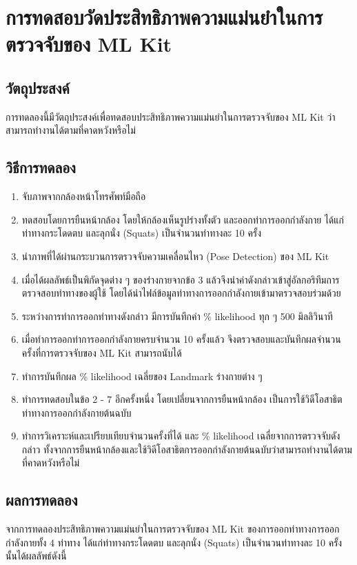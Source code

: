 \section{การทดสอบวัดประสิทธิภาพความแม่นยำในการตรวจจับของ ML Kit}
\tocless\subsection{วัตถุประสงค์}
การทดลองนี้มีวัตถุประสงค์เพื่อทดสอบประสิทธิภาพความแม่นยำในการตรวจจับของ ML Kit ว่าสามารถทำงานได้ตามที่คาดหวังหรือไม่
\tocless\subsection{วิธีการทดลอง}
\begin{enumerate}
	\item จับภาพจากกล้องหน้าโทรศัพท์มือถือ
	\item ทดสอบโดยการยืนหน้ากล้อง โดยให้กล้องเห็นรูปร่างทั้งตัว และออกท่าการออกกำลังกาย ได้แก่ท่าทางกระโดดตบ และลุกนั่ง (Squats) เป็นจำนวนท่าทางละ 10 ครั้ง
	\item นำภาพที่ได้ผ่านกระบวนการตรวจจับความเคลื่อนไหว (Pose Detection) ของ ML Kit
	\item เมื่อได้ผลลัพธ์เป็นพิกัดจุดต่าง ๆ ของร่างกายจากข้อ 3 แล้วจึงนำค่าดังกล่าวเข้าสู่อัลกอริทึมการตรวจสอบท่าทางของผู้ใช้ โดยได้นำไฟล์ข้อมูลท่าทางการออกกำลังกายเข้ามาตรวจสอบร่วมด้วย
	\item ระหว่างการทำการออกท่าทางดังกล่าว มีการบันทึกค่า \% likelihood ทุก ๆ 500 มิลลิวินาที
	\item เมื่อทำการออกท่าการออกกำลังกายครบจำนวน 10 ครั้งแล้ว จึงตรวจสอบและบันทึกผลจำนวนครั้งที่การตรวจจับของ ML Kit สามารถนับได้
	\item ทำการบันทึกผล \% likelihood เฉลี่ยของ Landmark ร่างกายต่าง ๆ
	\item ทำการทดสอบในข้อ 2 - 7 อีกครั้งหนึ่ง โดยเปลี่ยนจากการยืนหน้ากล้อง เป็นการใช้วิดีโอสาธิตท่าทางการออกกำลังกายต้นฉบับ
	\item ทำการวิเคราะห์และเปรียบเทียบจำนวนครั้งที่ได้ และ \% likelihood เฉลี่ยจากการตรวจจับดังกล่าว ทั้งจากการยืนหน้ากล้องและใช้วิดีโอสาธิตการออกกำลังกายต้นฉบับว่าสามารถทำงานได้ตามที่คาดหวังหรือไม่
\end{enumerate}
\tocless\subsection{ผลการทดลอง}
จากการทดลองประสิทธิภาพความแม่นยำในการตรวจจับของ ML Kit ของการออกท่าทางการออกกำลังกายทั้ง 4 ท่าทาง ได้แก่ท่าทางกระโดดตบ และลุกนั่ง (Squats) เป็นจำนวนท่าทางละ 10 ครั้งนั้นได้ผลลัพธ์ดังนี้
